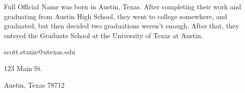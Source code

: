 \documentclass{utexasthesis}
\begin{document}
%
%	
%	
%		
%
%
%
%	
%	
%
%



 
% 


\begin{vita}
  Full Official Name was born in Austin, Texas. After completing their work and graduating from Austin High School, they went to college somewhere, and graduated, but then decided two graduations weren't enough.
  After that, they entered the Graduate School at the University of Texas at Austin.

  \begin{address}
    scott.stanie@utexas.edu

    123 Main St.

    Austin, Texas 78712
  \end{address}

\end{vita}
\end{document}
